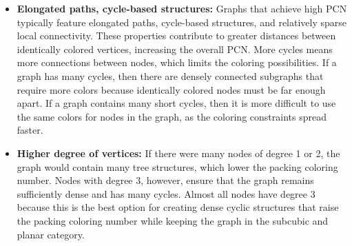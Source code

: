\documentclass[12pt,a4paper]{amsart}
\theoremstyle{definition}
\theoremstyle{plain}
\begin{document}
\begin{itemize}
    \item \textbf{Elongated paths, cycle-based structures:} Graphs that achieve high PCN typically feature elongated paths, cycle-based structures, 
    and relatively sparse local connectivity. These properties contribute to greater distances between identically colored vertices, increasing 
    the overall PCN. More cycles means more connections between nodes, which limits the coloring possibilities. If a graph has many cycles, 
    then there are densely connected subgraphs that require more colors because identically colored nodes must be far enough apart. If a graph 
    contains many short cycles, then it is more difficult to use the same colors for nodes in the graph, as the coloring constraints spread faster.

    \item \textbf{Higher degree of vertices:} If there were many nodes of degree 1 or 2, the graph would contain many tree structures, which lower the packing coloring 
    number. Nodes with degree 3, however, ensure that the graph remains sufficiently dense and has many cycles. Almost all nodes have degree 3 because this is the best option for creating dense cyclic structures that raise the packing 
    coloring number while keeping the graph in the subcubic and planar category.
\end{itemize}
\end{document}
